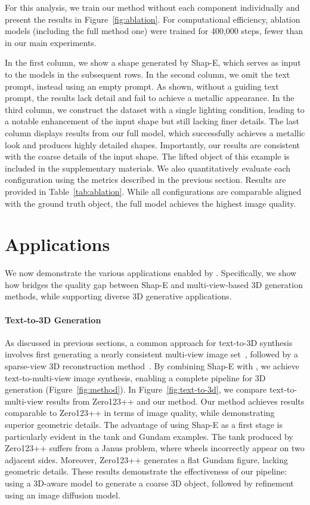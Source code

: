 For this analysis, we train our method without each component individually and present the results in Figure~\ref{fig:ablation}.
For computational efficiency, ablation models (including the full method one) were trained for 400,000 steps, fewer than in our main experiments.

In the first column, we show a shape generated by Shap-E, which serves as input to the models in the subsequent rows. In the second column, we omit the text prompt, instead using an empty prompt. As shown, without a guiding text prompt, the results lack detail and fail to achieve a metallic appearance. In the third column, we construct the dataset with a single lighting condition, leading to a notable enhancement of the input shape but still lacking finer details. The last column displays results from our full model, which successfully achieves a metallic look and produces highly detailed shapes. Importantly, our results are consistent with the coarse details of the input shape. The lifted object of this example is included in the supplementary materials.
We also quantitatively evaluate each configuration using the metrics described in the previous section. Results are provided in Table~\ref{tab:ablation}. While all configurations are comparable aligned with the ground truth object, the full model achieves the highest image quality.




\section{Applications}
We now demonstrate the various applications enabled by \ourname. Specifically, we show how \ourname{} bridges the quality gap between Shap-E and multi-view-based 3D generation methods, while supporting diverse 3D generative applications.


\vspace{-16pt}
\paragraph{Text-to-3D Generation}
As discussed in previous sections, a common approach for text-to-3D synthesis involves first generating a nearly consistent multi-view image set~\cite{shi2024mvdream, wang2023imagedream, shi2023zero123singleimageconsistent}, followed by a sparse-view 3D reconstruction method~\cite{xu2024instantmesh}. By combining Shap-E with \ourname, we achieve text-to-multi-view image synthesis, enabling a complete pipeline for 3D generation (Figure~\ref{fig:method}).
In Figure~\ref{fig:text-to-3d}, we compare text-to-multi-view results from Zero123++ and our method. Our method achieves results comparable to Zero123++ in terms of image quality, while demonstrating superior geometric details. The advantage of using Shap-E as a first stage is particularly evident in the tank and Gundam examples. The tank produced by Zero123++ suffers from a Janus problem, where wheels incorrectly appear on two adjacent sides. Moreover, Zero123++ generates a flat Gundam figure, lacking geometric details. These results demonstrate the effectiveness of our pipeline: using a 3D-aware model to generate a coarse 3D object, followed by refinement using an image diffusion model.


